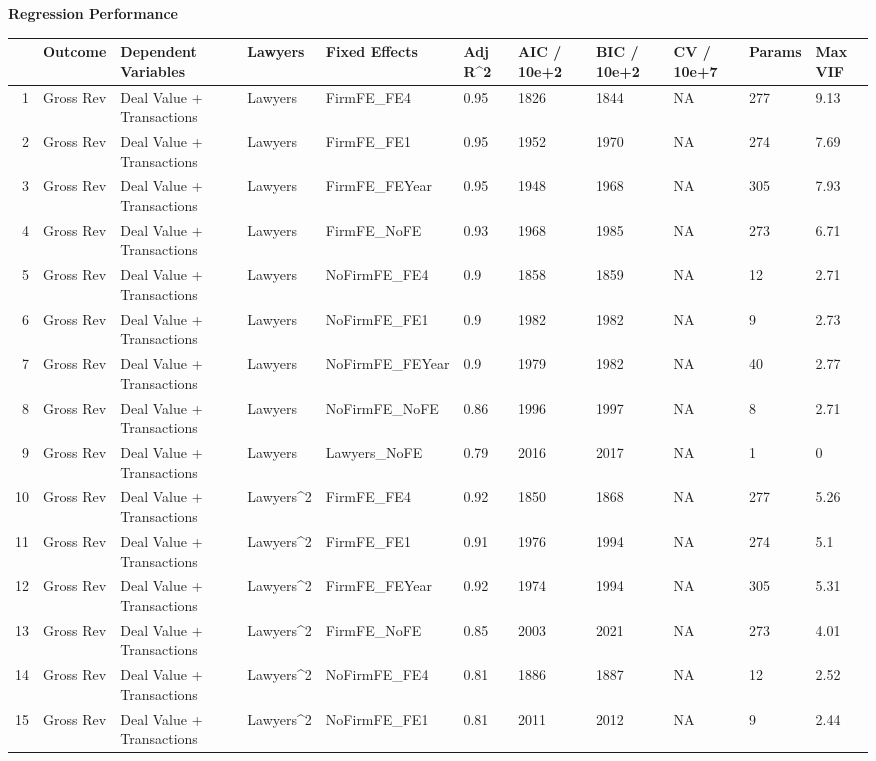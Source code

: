 \documentclass{article}
\begin{document}
\newpage
{\large \textbf{Regression Performance} }%
\begin{table}[H]
\centering
\begin{tabular}{rllllllllll}
  \hline
 & Outcome & Dependent Variables & Lawyers & Fixed Effects & Adj R^2 & AIC / 10e+2 & BIC / 10e+2 & CV / 10e+7 & Params & Max VIF \\ 
  \hline
1 & Gross Rev & Deal Value + Transactions & Lawyers & FirmFE\_FE4 & 0.95 & 1826 & 1844 & NA & 277 & 9.13 \\ 
  2 & Gross Rev & Deal Value + Transactions & Lawyers & FirmFE\_FE1 & 0.95 & 1952 & 1970 & NA & 274 & 7.69 \\ 
  3 & Gross Rev & Deal Value + Transactions & Lawyers & FirmFE\_FEYear & 0.95 & 1948 & 1968 & NA & 305 & 7.93 \\ 
  4 & Gross Rev & Deal Value + Transactions & Lawyers & FirmFE\_NoFE & 0.93 & 1968 & 1985 & NA & 273 & 6.71 \\ 
  5 & Gross Rev & Deal Value + Transactions & Lawyers & NoFirmFE\_FE4 & 0.9 & 1858 & 1859 & NA & 12 & 2.71 \\ 
  6 & Gross Rev & Deal Value + Transactions & Lawyers & NoFirmFE\_FE1 & 0.9 & 1982 & 1982 & NA & 9 & 2.73 \\ 
  7 & Gross Rev & Deal Value + Transactions & Lawyers & NoFirmFE\_FEYear & 0.9 & 1979 & 1982 & NA & 40 & 2.77 \\ 
  8 & Gross Rev & Deal Value + Transactions & Lawyers & NoFirmFE\_NoFE & 0.86 & 1996 & 1997 & NA & 8 & 2.71 \\ 
  9 & Gross Rev & Deal Value + Transactions & Lawyers & Lawyers\_NoFE & 0.79 & 2016 & 2017 & NA & 1 & 0 \\ 
  10 & Gross Rev & Deal Value + Transactions & Lawyers^2 & FirmFE\_FE4 & 0.92 & 1850 & 1868 & NA & 277 & 5.26 \\ 
  11 & Gross Rev & Deal Value + Transactions & Lawyers^2 & FirmFE\_FE1 & 0.91 & 1976 & 1994 & NA & 274 & 5.1 \\ 
  12 & Gross Rev & Deal Value + Transactions & Lawyers^2 & FirmFE\_FEYear & 0.92 & 1974 & 1994 & NA & 305 & 5.31 \\ 
  13 & Gross Rev & Deal Value + Transactions & Lawyers^2 & FirmFE\_NoFE & 0.85 & 2003 & 2021 & NA & 273 & 4.01 \\ 
  14 & Gross Rev & Deal Value + Transactions & Lawyers^2 & NoFirmFE\_FE4 & 0.81 & 1886 & 1887 & NA & 12 & 2.52 \\ 
  15 & Gross Rev & Deal Value + Transactions & Lawyers^2 & NoFirmFE\_FE1 & 0.81 & 2011 & 2012 & NA & 9 & 2.44 \\ 

\end{tabular}
\end{table}
\end{document}
